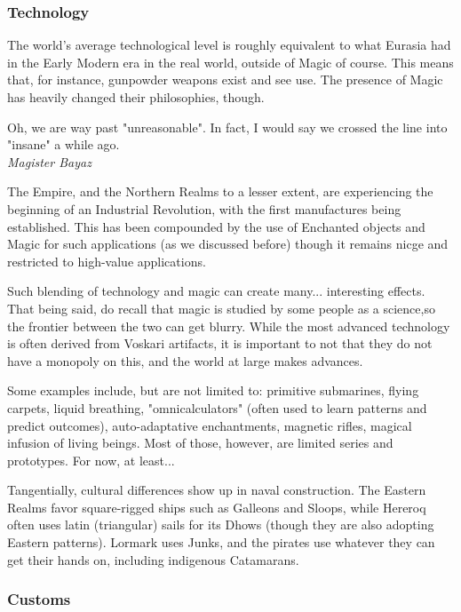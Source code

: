 \subsubsection{Technology}

The world's average technological level is roughly equivalent to what Eurasia had in the Early Modern era in the real world, outside of Magic of course. This means that, for instance, gunpowder weapons exist and see use. The presence of Magic has heavily changed their philosophies, though.

\begin{rpg-quotebox}
    Oh, we are way past "unreasonable". In fact, I would say we crossed the line into "insane" a while ago. \\ \textendash \textit{Magister Bayaz}
\end{rpg-quotebox}

The Empire, and the Northern Realms to a lesser extent, are experiencing the beginning of an Industrial Revolution, with the first manufactures being established. This has been compounded by the use of Enchanted objects and Magic for such applications (as we discussed before) though it remains nicge and restricted to high-value applications. 

Such blending of technology and magic can create many... interesting effects. That being said, do recall that magic is studied by some people as a science,so the frontier between the two can get blurry. While the most advanced technology is often derived from Voskari artifacts, it is important to not that they do not have a monopoly on this, and the world at large makes advances.

Some examples include, but are not limited to: primitive submarines, flying carpets, liquid breathing, "omnicalculators" (often used to learn patterns and predict outcomes), auto-adaptative enchantments, magnetic rifles, magical infusion of living beings. Most of those, however, are limited series and prototypes. For now, at least...

Tangentially, cultural differences show up in naval construction. The Eastern Realms favor square-rigged ships such as Galleons and Sloops, while Hereroq often uses latin (triangular) sails for its Dhows (though they are also adopting Eastern patterns). Lormark uses Junks, and the pirates use whatever they can get their hands on, including indigenous Catamarans. 

\subsubsection{Customs}

